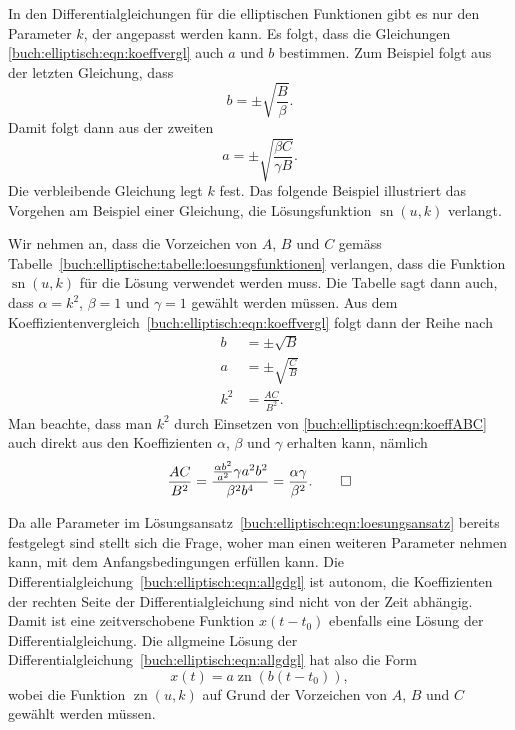 In den Differentialgleichungen für die elliptischen Funktionen gibt
es nur den Parameter $k$, der angepasst werden kann.
Es folgt, dass die Gleichungen
\eqref{buch:elliptisch:eqn:koeffvergl} 
auch $a$ und $b$ bestimmen.
Zum Beispiel folgt aus der letzten Gleichung, dass
\[
b = \pm\sqrt{\frac{B}{\beta}}.
\]
Damit folgt dann aus der zweiten
\[
a=\pm\sqrt{\frac{\beta C}{\gamma B}}.
\]
Die verbleibende Gleichung legt $k$ fest.
Das folgende Beispiel illustriert das Vorgehen am Beispiel einer
Gleichung, die Lösungsfunktion $\operatorname{sn}(u,k)$ verlangt.

\begin{beispiel}
Wir nehmen an, dass die Vorzeichen von $A$, $B$ und $C$ gemäss
Tabelle~\ref{buch:elliptische:tabelle:loesungsfunktionen} verlangen,
dass die Funktion $\operatorname{sn}(u,k)$ für die Lösung verwendet
werden muss.
Die Tabelle sagt dann auch, dass 
$\alpha=k^2$, $\beta=1$ und $\gamma=1$ gewählt werden müssen.
Aus dem Koeffizientenvergleich~\eqref{buch:elliptisch:eqn:koeffvergl}
folgt dann der Reihe nach
\begin{align*}
b&=\pm \sqrt{B}
\\
a&=\pm \sqrt{\frac{C}{B}}
\\
k^2
&=
\frac{AC}{B^2}.
\end{align*}
Man beachte, dass man $k^2$ durch Einsetzen von
\eqref{buch:elliptisch:eqn:koeffABC}
auch direkt aus den Koeffizienten $\alpha$, $\beta$ und $\gamma$
erhalten kann, nämlich
\[
\frac{AC}{B^2}
=
\frac{\frac{\alpha b^2}{a^2} \gamma a^2b^2}{\beta^2 b^4}
=
\frac{\alpha\gamma}{\beta^2}.
\qedhere
\]
\end{beispiel}

Da alle Parameter im 
Lösungsansatz~\eqref{buch:elliptisch:eqn:loesungsansatz} bereits
festgelegt sind stellt sich die Frage, woher man einen weiteren
Parameter nehmen kann, mit dem Anfangsbedingungen erfüllen kann.
Die Differentialgleichung~\eqref{buch:elliptisch:eqn:allgdgl} ist
autonom, die Koeffizienten der rechten Seite der Differentialgleichung
sind nicht von der Zeit abhängig. 
Damit ist eine zeitverschobene Funktion $x(t-t_0)$ ebenfalls eine
Lösung der Differentialgleichung.
Die allgmeine Lösung der 
Differentialgleichung~\eqref{buch:elliptisch:eqn:allgdgl} hat
also die Form
\[
x(t) = a\operatorname{zn}(b(t-t_0)),
\]
wobei die Funktion $\operatorname{zn}(u,k)$ auf Grund der Vorzeichen
von $A$, $B$ und $C$ gewählt werden müssen.

%
%

